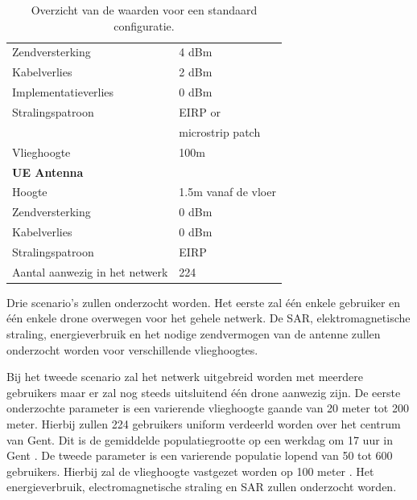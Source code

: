 \documentclass[twocolumn]{phdsymp_dutch}
\begin{document}
\begin{table}[!htb]
\begin{tabular}[t]{ll}
        \hspace{3mm}  Zendversterking           & 4 dBm   \\ 
        \hspace{3mm}  Kabelverlies               & 2 dBm   \\ 
        \hspace{3mm}  Implementatieverlies       & 0 dBm   \\
        \hspace{3mm}  Stralingspatroon         & EIRP or\\
         \hspace{3mm}                           & microstrip patch\\
        \hspace{3mm}  Vlieghoogte                & 100m  \\
        \hline
        \multicolumn{2}{l}{\textbf{UE Antenna}} \\
        \hline 
        \hspace{3mm} Hoogte                     & 1.5m vanaf de vloer      \\ 
        \hspace{3mm} Zendversterking                      & 0 dBm   \\ 
        \hspace{3mm} Kabelverlies              & 0 dBm   \\ 
        \hspace{3mm} Stralingspatroon         & EIRP  \\
        \hspace{3mm} Aantal aanwezig in het netwerk         & 224  \\
        \toprule
\end{tabular}
\caption{Overzicht van de waarden voor een standaard configuratie.}
\label{table:defaultconf}
\end{table}

Drie scenario's zullen onderzocht worden. Het eerste zal \'e\'en enkele gebruiker en 
 \'e\'en enkele drone overwegen 
voor het gehele netwerk. De \gls{SAR}, elektromagnetische straling, energieverbruik  en 
het nodige zendvermogen van de antenne zullen onderzocht worden voor verschillende vlieghoogtes.

Bij het tweede scenario zal het netwerk uitgebreid worden met meerdere gebruikers maar 
er zal nog steeds uitsluitend  \'e\'en drone aanwezig zijn. De eerste onderzochte parameter 
is een varierende vlieghoogte gaande van 20 meter tot 200 meter. Hierbij zullen 224 gebruikers 
uniform verdeerld worden over het centrum van Gent. Dit is de gemiddelde populatiegrootte op 
een werkdag om 17 uur in Gent \cite{J2}.
De tweede parameter is een varierende populatie lopend van 50 tot 600 gebruikers. Hierbij 
zal de vlieghoogte vastgezet worden op 100 meter \cite{J2}.
Het energieverbruik, electromagnetische straling en \gls{SAR} zullen onderzocht worden.
\end{document}
